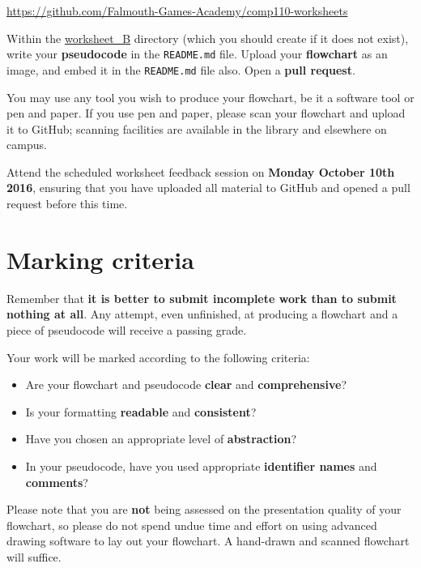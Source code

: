 \documentclass{../../fal_assignment}
\begin{document}
\url{https://github.com/Falmouth-Games-Academy/comp110-worksheets}

Within the \url{worksheet_B} directory (which you should create if it does not exist),
write your \textbf{pseudocode} in the \texttt{README.md} file.
Upload your \textbf{flowchart} as an image, and embed it in the \texttt{README.md} file also.
Open a \textbf{pull request}.

You may use any tool you wish to produce your flowchart,
be it a software tool or pen and paper.
If you use pen and paper, please scan your flowchart and upload it to GitHub;
scanning facilities are available in the library and elsewhere on campus.

Attend the scheduled worksheet feedback session on \textbf{Monday October 10th 2016},
ensuring that you have uploaded all material to GitHub and opened a pull request before this time.

\section*{Marking criteria}

Remember that \textbf{it is better to submit incomplete work than to submit nothing at all}.
Any attempt, even unfinished, at producing a flowchart and a piece of pseudocode will receive a passing grade.

Your work will be marked according to the following criteria:
\begin{itemize}
	\item Are your flowchart and pseudocode \textbf{clear} and \textbf{comprehensive}?
	\item Is your formatting \textbf{readable} and \textbf{consistent}?
	\item Have you chosen an appropriate level of \textbf{abstraction}?
	\item In your pseudocode, have you used appropriate \textbf{identifier names} and \textbf{comments}?
\end{itemize}

Please note that you are \textbf{not} being assessed on the presentation quality of your flowchart,
so please do not spend undue time and effort on using advanced drawing software to lay out your flowchart.
A hand-drawn and scanned flowchart will suffice.
\end{document}
